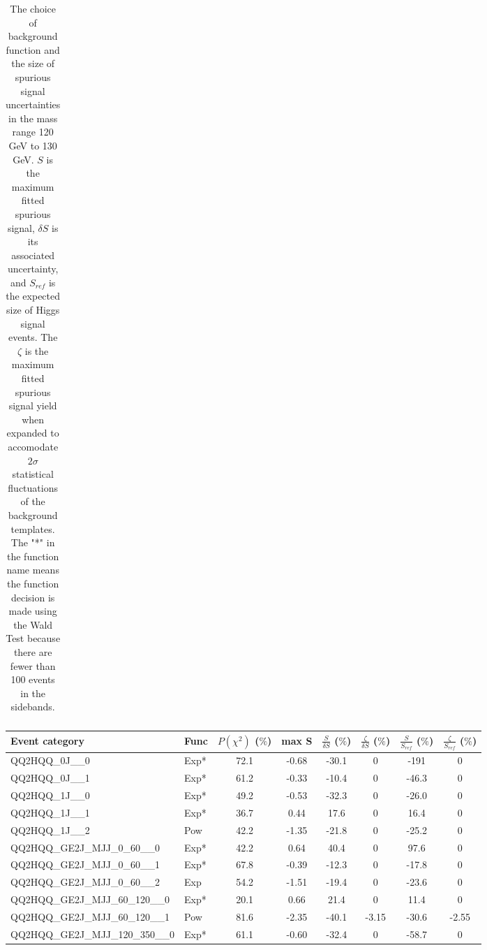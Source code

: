 \begin{table}[!h]
\begin{adjustbox}{width={\textwidth},totalheight={\textheight},keepaspectratio}
\begin{tabular}{llcccccc}
    \hline
      \hline
      \end{tabular}
      \end{adjustbox}
      \caption{The choice of background function and the size of spurious signal uncertainties in the mass range 120 GeV to 130 GeV. $S$ is the maximum fitted spurious signal, $\delta S$ is its associated uncertainty, and $S_{ref}$ is the expected size of Higgs signal events. The $\zeta$ is the maximum fitted spurious signal yield when expanded to accomodate $2\sigma$ statistical fluctuations of the background templates. The "*" in the function name means the function decision is made using the Wald Test because there are fewer than 100 events in the sidebands.
   \label{tab:spurious_sig}   }
\end{table}

\begin{table}[!h]
   \centering  \scriptsize
    \begin{adjustbox}{width={\textwidth},totalheight={\textheight},keepaspectratio}
    \begin{tabular}{llcccccc}
    \hline
    \hline
   Event category               & Func &  $P(\chi^2)$ ($\%$) & max S  & $\frac{S}{\delta S}$ ($\%$)  &  $\frac{\zeta}{\delta S}$ ($\%$)   & $\frac{S}{S_{ref}}$ ($\%$) & $\frac{\zeta}{S_{ref}}$ ($\%$)  \\ \hline
    \hline
 QQ2HQQ\_0J\_\_0 & Exp* & 72.1 & -0.68 & -30.1 & 0 & -191 & 0 \\
 QQ2HQQ\_0J\_\_1 & Exp* & 61.2 & -0.33 & -10.4 & 0 & -46.3 & 0  \\
 QQ2HQQ\_1J\_\_0 & Exp* & 49.2 & -0.53 & -32.3 & 0 & -26.0 & 0 \\
 QQ2HQQ\_1J\_\_1 & Exp* & 36.7 & 0.44 & 17.6 & 0 & 16.4 & 0 \\
 QQ2HQQ\_1J\_\_2 & Pow & 42.2 & -1.35 & -21.8 & 0 & -25.2 & 0 \\
 QQ2HQQ\_GE2J\_MJJ\_0\_60\_\_0 & Exp* & 42.2 & 0.64 & 40.4 & 0 & 97.6 & 0 \\
 QQ2HQQ\_GE2J\_MJJ\_0\_60\_\_1 & Exp* & 67.8 & -0.39 & -12.3 & 0 & -17.8 & 0 \\
 QQ2HQQ\_GE2J\_MJJ\_0\_60\_\_2 & Exp & 54.2 & -1.51 & -19.4 & 0 & -23.6 & 0 \\
 QQ2HQQ\_GE2J\_MJJ\_60\_120\_\_0 & Exp* & 20.1 & 0.66 & 21.4 & 0 & 11.4 & 0 \\
 QQ2HQQ\_GE2J\_MJJ\_60\_120\_\_1 & Pow & 81.6 & -2.35 & -40.1 & -3.15 & -30.6 & -2.55 \\
 QQ2HQQ\_GE2J\_MJJ\_120\_350\_\_0 & Exp* & 61.1 & -0.60 & -32.4 & 0 & -58.7 & 0 \\

\end{tabular}
\end{adjustbox}
\end{table}
